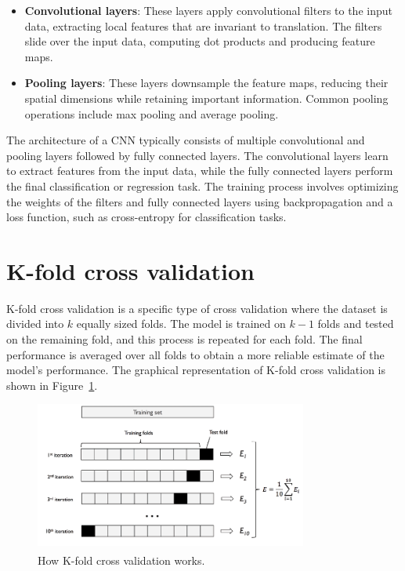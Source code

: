 \begin{itemize}
	\item \textbf{Convolutional layers}: These layers apply convolutional filters to the input data, extracting local features
	      that are invariant to translation. The filters slide over the input data, computing dot products and producing feature maps.
	\item \textbf{Pooling layers}: These layers downsample the feature maps, reducing their spatial dimensions while retaining important
	      information. Common pooling operations include max pooling and average pooling.
\end{itemize}

The architecture of a CNN typically consists of multiple convolutional and pooling layers followed by fully connected layers.
The convolutional layers learn to extract features from the input data, while the fully connected layers perform the final classification
or regression task. The training process involves optimizing the weights of the filters and fully connected layers using backpropagation
and a loss function, such as cross-entropy for classification tasks.

\section{K-fold cross validation}
\label{sec:k_fold_cross_validation}

K-fold cross validation is a specific type of cross validation where the dataset is divided into $k$ equally sized folds. The model is trained
on $k-1$ folds and tested on the remaining fold, and this process is repeated for each fold. The final performance is averaged over all folds
to obtain a more reliable estimate of the model's performance. The graphical representation of K-fold cross validation is shown in Figure~\ref{fig:k_fold}.

\begin{figure}[H]
	\centering
	\includegraphics[width=0.8\textwidth]{../imgs/kfold.png}
	\caption{How K-fold cross validation works.~\textsuperscript{\cite{Raschka-Mirjalili-2017}}}
	\label{fig:k_fold}
\end{figure}

